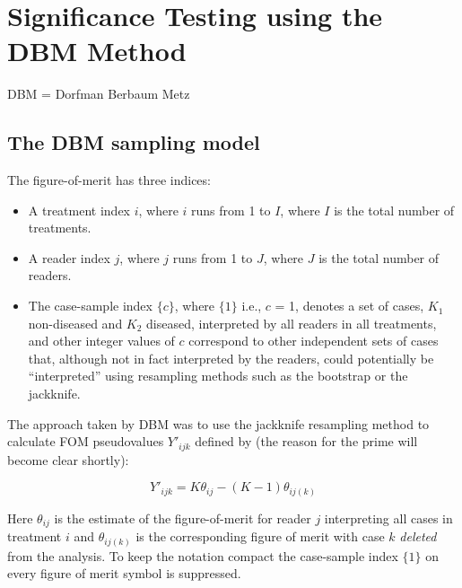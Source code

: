 \documentclass[
]{book}
\providecommand{\tightlist}{%
  \setlength{\itemsep}{0pt}\setlength{\parskip}{0pt}}
\begin{document}
\hypertarget{DBMAnalysisSigtesting}{%
\chapter{Significance Testing using the DBM Method}\label{DBMAnalysisSigtesting}}

DBM = Dorfman Berbaum Metz

\hypertarget{the-dbm-sampling-model}{%
\section{The DBM sampling model}\label{the-dbm-sampling-model}}

The figure-of-merit has three indices:

\begin{itemize}
\tightlist
\item
  A treatment index \(i\), where \(i\) runs from 1 to \(I\), where \(I\) is the total number of treatments.\\
\item
  A reader index \(j\), where \(j\) runs from 1 to \(J\), where \(J\) is the total number of readers.\\
\item
  The case-sample index \(\{c\}\), where \(\{1\}\) i.e., \(c\) = 1, denotes a set of cases, \(K_1\) non-diseased and \(K_2\) diseased, interpreted by all readers in all treatments, and other integer values of \(c\) correspond to other independent sets of cases that, although not in fact interpreted by the readers, could potentially be ``interpreted'' using resampling methods such as the bootstrap or the jackknife.
\end{itemize}

The approach \citep{RN204} taken by DBM was to use the jackknife resampling method to calculate FOM pseudovalues \({Y'}_{ijk}\) defined by (the reason for the prime will become clear shortly):

\begin{equation}
Y'_{ijk}=K\theta_{ij}-(K-1)\theta_{ij(k)}
\label{eq:pseudoValPrime}
\end{equation}

Here \(\theta_{ij}\) is the estimate of the figure-of-merit for reader \(j\) interpreting all cases in treatment \(i\) and \(\theta_{ij(k)}\) is the corresponding figure of merit with case \(k\) \emph{deleted} from the analysis. To keep the notation compact the case-sample index \(\{1\}\) on every figure of merit symbol is suppressed.
\end{document}
